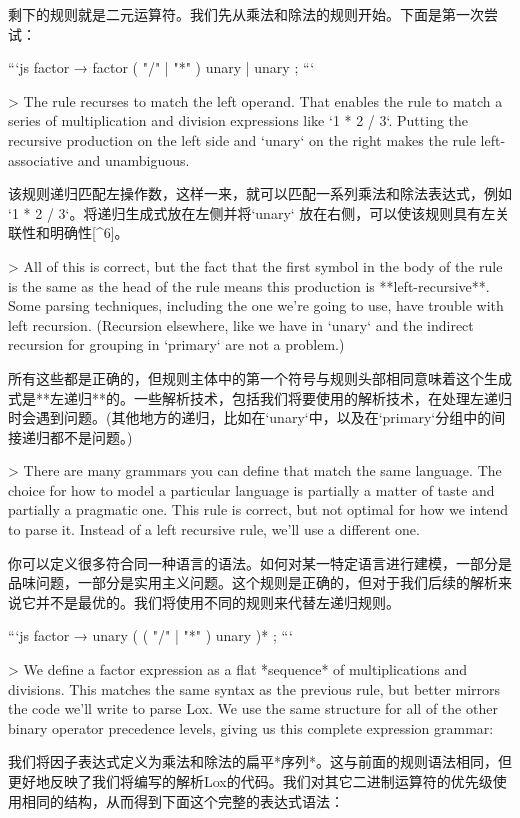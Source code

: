 \documentclass[cn,11pt,chinese]{elegantbook}
\begin{document}
剩下的规则就是二元运算符。我们先从乘法和除法的规则开始。下面是第一次尝试：

```js
factor         → factor ( "/" | "*" ) unary
               | unary ;
```

> The rule recurses to match the left operand. That enables the rule to match a series of multiplication and division expressions like `1 * 2 / 3`. Putting the recursive production on the left side and `unary` on the right makes the rule left-associative and unambiguous.

该规则递归匹配左操作数，这样一来，就可以匹配一系列乘法和除法表达式，例如 `1 * 2 / 3`。将递归生成式放在左侧并将`unary` 放在右侧，可以使该规则具有左关联性和明确性[^6]。

> All of this is correct, but the fact that the first symbol in the body of the rule is the same as the head of the rule means this production is **left-recursive**. Some parsing techniques, including the one we’re going to use, have trouble with left recursion. (Recursion elsewhere, like we have in `unary` and the indirect recursion for grouping in `primary` are not a problem.)

所有这些都是正确的，但规则主体中的第一个符号与规则头部相同意味着这个生成式是**左递归**的。一些解析技术，包括我们将要使用的解析技术，在处理左递归时会遇到问题。(其他地方的递归，比如在`unary`中，以及在`primary`分组中的间接递归都不是问题。)

> There are many grammars you can define that match the same language. The choice for how to model a particular language is partially a matter of taste and partially a pragmatic one. This rule is correct, but not optimal for how we intend to parse it. Instead of a left recursive rule, we’ll use a different one.

你可以定义很多符合同一种语言的语法。如何对某一特定语言进行建模，一部分是品味问题，一部分是实用主义问题。这个规则是正确的，但对于我们后续的解析来说它并不是最优的。我们将使用不同的规则来代替左递归规则。

```js
factor         → unary ( ( "/" | "*" ) unary )* ;
```

> We define a factor expression as a flat *sequence* of multiplications and divisions. This matches the same syntax as the previous rule, but better mirrors the code we’ll write to parse Lox. We use the same structure for all of the other binary operator precedence levels, giving us this complete expression grammar:

我们将因子表达式定义为乘法和除法的扁平*序列*。这与前面的规则语法相同，但更好地反映了我们将编写的解析Lox的代码。我们对其它二进制运算符的优先级使用相同的结构，从而得到下面这个完整的表达式语法：
\end{document}
